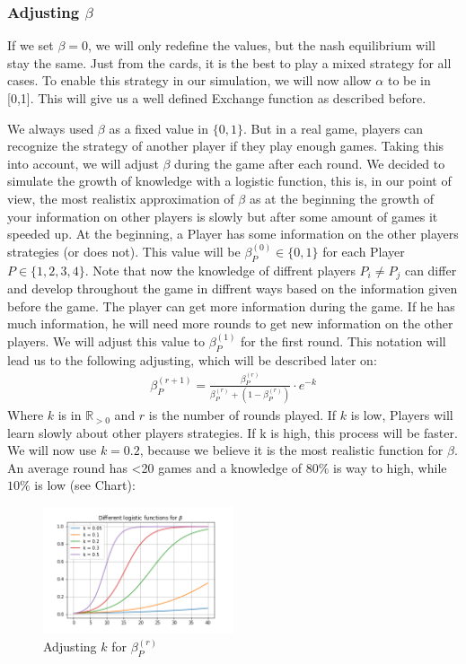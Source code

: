 \subsubsection{Adjusting $\beta$}

If we set $\beta = 0$, we will only redefine the values, but the nash equilibrium will stay the same. Just from the cards, it is the best to play a mixed strategy for all cases. To enable this strategy in our simulation, we will now allow $\alpha$ to be in [0,1]. This will give us a well defined Exchange function as described before.

We always used $\beta$ as a fixed value in $\{0,1\}$. But in a real game, players can recognize the strategy of another player if they play enough games. Taking this into account, we will adjust $\beta$ during the game after each round. We decided to simulate the growth of knowledge with a logistic function, this is, in our point of view, the most realistix approximation of $\beta$ as at the beginning the growth of your information on other players is slowly but after some amount of games it speeded up. At the beginning, a Player has some information on the other players strategies (or does not). This value will be $\beta^{(0)}_{P}\in\{0,1\}$ for each Player $P\in\{1,2,3,4\}$. Note that now the knowledge of diffrent players $P_i\neq P_j$ can differ and develop throughout the game in diffrent ways based on the information given before the game. The player can get more information during the game. If he has much information, he will need more rounds to get new information on the other players. We will adjust this value to $\beta^{(1)}_{P}$ for the first round. This notation will lead us to the following adjusting, which will be described later on:
\begin{align*}
\beta^{(r+1)}_{P} = \frac{\beta^{(r)}_{P}
}{\beta^{(r)}_{P} + (1 - \beta^{(r)}_{P})} \cdot e^{-k}
\end{align*}
Where $k$ is in $\mathbb{R}_{>0}$ and $r$ is the number of rounds played. If $k$ is low, Players will learn slowly about other players strategies. If k is high, this process will be faster. We will now use $k = 0.2$, because we believe it is the most realistic function for $\beta$. An average round has <20 games and a knowledge of $80\%$ is way to high, while $10\%$ is low (see Chart):

\begin{figure}[h!]
    \centering
    \includegraphics[width=0.5\textwidth]{Bilder/5_log}
    \caption{Adjusting $k$ for $\beta^{(r)}_{P}$}
    \label{fig:meine-grafik}
\end{figure}

